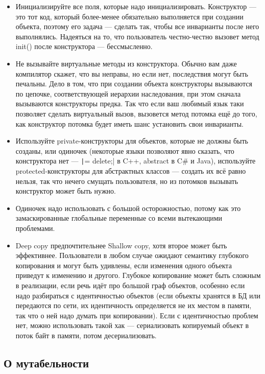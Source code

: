\documentclass{../../text-style}
\begin{document}
\begin{itemize}
	\item Инициализируйте все поля, которые надо инициализировать. Конструктор --- это тот код, который более-менее обязательно выполняется при создании объекта, поэтому его задача --- сделать так, чтобы все инварианты после него выполнялись. Надеяться на то, что пользователь честно-честно вызовет метод init() после конструктора --- бессмысленно.
	\item Не вызывайте виртуальные методы из конструктора. Обычно вам даже компилятор скажет, что вы неправы, но если нет, последствия могут быть печальны. Дело в том, что при создании объекта конструкторы вызываются по цепочке, соответствующей иерархии наследования, при этом сначала вызываются конструкторы предка. Так что если ваш любимый язык таки позволяет сделать виртуальный вызов, вызовется метод потомка ещё до того, как конструктор потомка будет иметь шанс установить свои инварианты.
	\item Используйте private-конструкторы для объектов, которые не должны быть созданы, или одиночек (некоторые языки позволяют явно сказать, что конструктора нет --- \texttt|= delete;| в C++, abstract в C\# и Java), используйте protected-конструкторы для абстрактных классов --- создать их всё равно нельзя, так что нечего смущать пользователя, но из потомков вызывать конструктор может быть нужно.
	\item Одиночек надо использовать с большой осторожностью, потому как это замаскированные глобальные переменные со всеми вытекающими проблемами.
	\item Deep copy предпочтительнее Shallow copy, хотя второе может быть эффективнее. Пользователи в любом случае ожидают семантику глубокого копирования и могут быть удивлены, если изменения одного объекта приведут к изменению и другого. Глубокое копирование может быть сложным в реализации, если речь идёт про большой граф объектов, особенно если надо разбираться с идентичностью объектов (если объекты хранятся в БД или передаются по сети, их идентичность определяется не их местом в памяти, так что о ней надо думать при копировании). Если с идентичностью проблем нет, можно использовать такой хак --- сериализовать копируемый объект в поток байт в памяти, потом десериализовать.
\end{itemize}

\subsection{О мутабельности}
\end{document}
